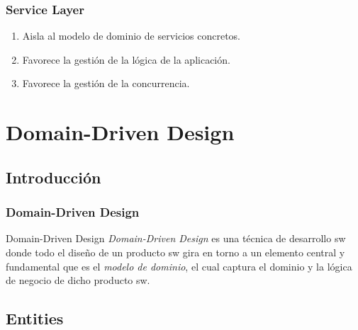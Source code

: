 \documentclass[a4paper,slidestop,xcolor=pst,dvips,blue]{beamer}
\begin{document}
\begin{frame}[c]
    \frametitle{Service Layer}
    \begin{enumerate}
        \item<1-> Aisla al modelo de dominio de servicios concretos.
        \item<2-> Favorece la gestión de la lógica de la aplicación.
        \item<3-> Favorece la gestión de la concurrencia.
    \end{enumerate}
\end{frame}

\section{Domain-Driven Design}

\subsection{Introducción}

\begin{frame}[c]
    \frametitle{Domain-Driven Design}
     \begin{block}{Domain-Driven Design}
        \alert{\emph{Domain-Driven Design}} es una técnica de desarrollo sw donde todo el diseño de un producto sw gira en torno a un elemento central y fundamental que es el \emph{modelo de dominio}, el cual captura el dominio y la lógica de negocio de dicho producto sw.
     \end{block}

\end{frame}

%
\subsection{Entities}
\end{document}
